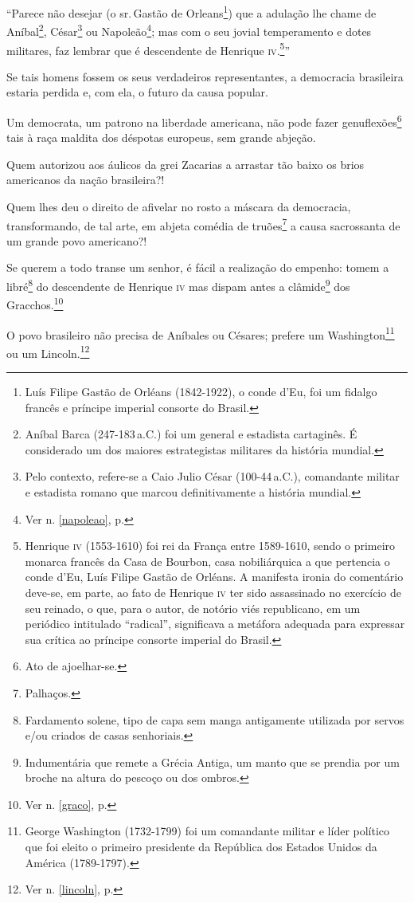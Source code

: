 ``Parece não desejar (o sr.\,Gastão de Orleans\footnote{Luís Filipe
  Gastão de Orléans (1842-1922), o conde d'Eu, foi um fidalgo francês e
  príncipe imperial consorte do Brasil.}) que a adulação lhe chame de
Aníbal\footnote{Aníbal Barca (247-183\,a.C.) foi um general e estadista
  cartaginês. É considerado um dos maiores estrategistas militares da
  história mundial.}, César\footnote{Pelo contexto, refere-se a Caio
  Julio César (100-44\,a.C.), comandante militar e estadista romano que
  marcou definitivamente a história mundial.} ou Napoleão\footnote{
  Ver n. \ref{napoleao}, p. \pageref{napoleao}}; mas com o seu jovial
temperamento e dotes militares, faz lembrar que é descendente de
Henrique \textsc{iv}.\footnote{Henrique \textsc{iv} (1553-1610) foi rei da França entre
  1589-1610, sendo o primeiro monarca francês da Casa de Bourbon, casa
  nobiliárquica a que pertencia o conde d'Eu, Luís Filipe Gastão de
  Orléans. A manifesta ironia do comentário deve-se, em parte, ao fato
  de Henrique \textsc{iv} ter sido assassinado no exercício de seu reinado, o
  que, para o autor, de notório viés republicano, em um periódico
  intitulado ``radical'', significava a metáfora adequada para expressar
  sua crítica ao príncipe consorte imperial do Brasil.}''

Se tais homens fossem os seus verdadeiros representantes, a democracia
brasileira estaria perdida e, com ela, o futuro da causa popular.

Um democrata, um patrono na liberdade americana, não pode fazer
genuflexões\footnote{Ato de ajoelhar-se.} tais à raça maldita dos
déspotas europeus, sem grande abjeção.

Quem autorizou aos áulicos da grei Zacarias a arrastar tão baixo os
brios americanos da nação brasileira?!

Quem lhes deu o direito de afivelar no rosto a máscara da democracia,
transformando, de tal arte, em abjeta comédia de truões\footnote{
  Palhaços.} a causa sacrossanta de um grande povo americano?!

Se querem a todo transe um senhor, é fácil a realização do empenho:
tomem a libré\footnote{Fardamento solene, tipo de capa sem manga
  antigamente utilizada por servos e/ou criados de casas senhoriais.} do
descendente de Henrique \textsc{iv} mas dispam antes a clâmide\footnote{
  Indumentária que remete a Grécia Antiga, um manto que se prendia por
  um broche na altura do pescoço ou dos ombros.} dos
Gracchos.\footnote{Ver n. \ref{graco}, p. \pageref{graco}}

O povo brasileiro não precisa de Aníbales ou Césares; prefere um
Washington\footnote{George Washington (1732-1799) foi um comandante
  militar e líder político que foi eleito o primeiro presidente da
  República dos Estados Unidos da América (1789-1797).} ou um
Lincoln.\footnote{Ver n. \ref{lincoln}, p. \pageref{lincoln}}

